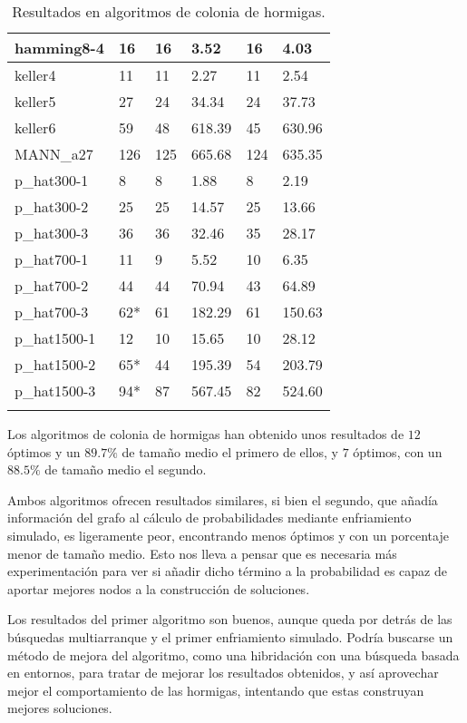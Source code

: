 \begin{small}
\begin{longtable}{l l l l l l}
    hamming8-4         & 16 & 16 & 3.52 & 16 & 4.03\\ \hline
    keller4            & 11 & 11 & 2.27 & 11 & 2.54\\ \hline
    keller5            & 27 & 24 & 34.34 & 24 & 37.73\\ \hline
    keller6            & 59 & 48 & 618.39 & 45 & 630.96\\ \hline
    MANN\_a27          & 126 & 125 & 665.68 & 124 & 635.35\\ \hline
    p\_hat300-1        & 8 & 8 & 1.88 & 8 & 2.19\\ \hline
    p\_hat300-2        & 25 & 25 & 14.57 & 25 & 13.66\\ \hline
    p\_hat300-3        & 36 & 36 & 32.46 & 35 & 28.17\\ \hline
    p\_hat700-1        & 11 & 9 & 5.52 & 10 & 6.35\\ \hline
    p\_hat700-2        & 44 & 44 & 70.94 & 43 & 64.89\\ \hline
    p\_hat700-3        & 62* & 61 & 182.29 & 61 & 150.63\\ \hline
    p\_hat1500-1       & 12 & 10 & 15.65 & 10 & 28.12 \\ \hline
    p\_hat1500-2       & 65* & 44 & 195.39 & 54 & 203.79\\ \hline
    p\_hat1500-3       & 94* & 87 & 567.45 & 82 & 524.60 \\ \hline
  \caption{Resultados en algoritmos de colonia de hormigas.}
\end{longtable}
\end{small}

Los algoritmos de colonia de hormigas han obtenido unos resultados de $12$ óptimos
y un $89.7\%$ de tamaño medio el primero de ellos, y $7$ óptimos, con un $88.5\%$
de tamaño medio el segundo.

Ambos algoritmos ofrecen resultados similares, si bien el segundo, que añadía información
del grafo al cálculo de probabilidades mediante enfriamiento simulado, es ligeramente
peor, encontrando menos óptimos y con un porcentaje menor de tamaño medio. Esto nos
lleva a pensar que es necesaria más experimentación para ver si añadir dicho término
a la probabilidad es capaz de aportar mejores nodos a la construcción de soluciones.

Los resultados del primer algoritmo son buenos, aunque queda por detrás de las búsquedas
multiarranque y el primer enfriamiento simulado. Podría buscarse un método de mejora
del algoritmo, como una hibridación con una búsqueda basada en entornos, para tratar
de mejorar los resultados obtenidos, y así aprovechar mejor el comportamiento de las
hormigas, intentando que estas construyan mejores soluciones.

